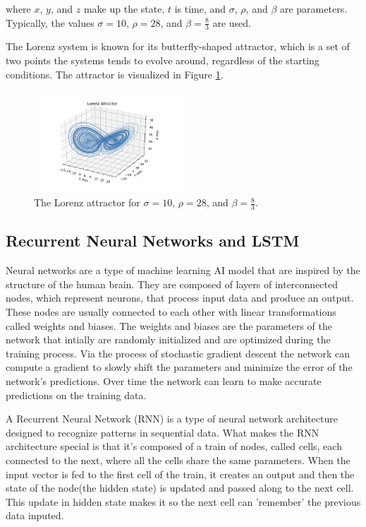 \documentclass[11pt]{article}
\begin{document}
where $x$, $y$, and $z$ make up the state, $t$ is time, and $\sigma$, $\rho$, and $\beta$ are parameters. Typically, the values $\sigma = 10$, $\rho = 28$, and $\beta = \frac{8}{3}$ are used.

The Lorenz system is known for its butterfly-shaped attractor, which is a set of two points the systems tends to evolve around, regardless of the starting conditions. The attractor is visualized in Figure \ref{fig:lorenz_attractor}.

\begin{figure}[h]
\centering
\includegraphics[width=0.5\textwidth]{lorenz_attractor.png}
\caption{The Lorenz attractor for $\sigma = 10$, $\rho = 28$, and $\beta = \frac{8}{3}$.}
\label{fig:lorenz_attractor}
\end{figure}

\subsection{Recurrent Neural Networks and LSTM}

Neural networks are a type of machine learning AI model that are inspired by the structure of the human brain. They are composed of layers of interconnected nodes, which represent neurons, that process input data and produce an output. These nodes are usually connected to each other with linear transformations called weights and biases. The weights and biases are the parameters of the network that intially are randomly initialized and are optimized during the training process. Via the process of stochastic gradient descent the network can compute a gradient to slowly shift the parameters and minimize the error of the network's predictions. Over time the network can learn to make accurate predictions on the training data.

A Recurrent Neural Network (RNN) is a type of neural network architecture designed to recognize patterns in sequential data. What makes the RNN architecture special is that it's composed of a train of nodes, called cells, each connected to the next, where all the cells share the same parameters. When the input vector is fed to the first cell of the train, it creates an output and then the state of the node(the hidden state) is updated and passed along to the next cell. This update in hidden state makes it so the next cell can 'remember' the previous data inputed. 
\end{document}
